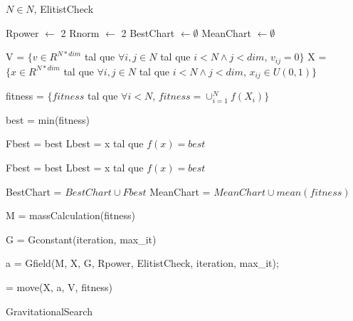 \documentclass{article}
\begin{document}
\begin{algorithm}
\begin{algorithmic}[1]
    \REQUIRE $N \in N$, ElitistCheck

    \STATE Rpower $\leftarrow$ 2
    \STATE Rnorm $\leftarrow$  2
    \STATE BestChart $\leftarrow \emptyset$
    \STATE MeanChart $\leftarrow \emptyset$

    \STATE V = $\{v \in R^{N*dim}$ tal que $\forall i,j \in N$ tal que $i < N \wedge j < dim$, $v_{ij} = 0\}$
    \STATE X = $\{x \in R^{N*dim}$ tal que $\forall i,j \in N$ tal que $i < N \wedge j < dim$, $x_{ij} \in U(0,1)\}$

        \STATE fitness = $\{fitness$ tal que $\forall i < N$, $fitness = \cup_{i=1}^N f(X_i)\}$

        \STATE best = min(fitness)


            \STATE Fbest = best
            \STATE Lbest = x tal que $f(x) = best$
        \ENDIF

            \STATE Fbest = best
            \STATE Lbest = x tal que $f(x) = best$
        \ENDIF


        \STATE BestChart = $BestChart \cup Fbest$
        \STATE MeanChart = $MeanChart \cup mean(fitness)$

        \STATE M = massCalculation(fitness)

        \STATE G = Gconstant(iteration, max\_it)

        \STATE a = Gfield(M, X, G, Rpower, ElitistCheck, iteration, max\_it);

        \STATE [X, V] = move(X, a, V, fitness) 
    \ENDFOR

\end{algorithmic}
\caption{GravitationalSearch}
\end{algorithm}
 
\end{document}
